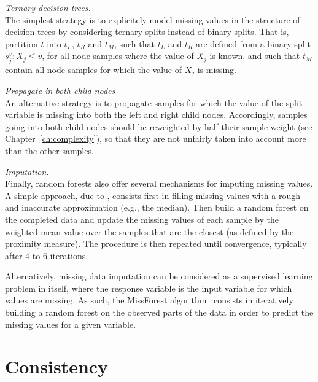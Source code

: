 \begin{description}

\item \textit{Ternary decision trees.}\hfill\\
    The simplest strategy is to explicitely model missing values in the
    structure of decision trees by considering ternary splits instead of binary
    splits. That is, partition $t$ into $t_L$, $t_R$ and $t_M$, such that $t_L$
    and $t_R$ are defined from a binary split $s_j^v : X_j \leq v$, for all node
    samples where the value of $X_j$ is known, and such that $t_M$ contain all node
    samples for which the value of $X_j$ is missing.

\item \textit{Propagate in both child nodes}\hfill\\
    An alternative strategy is to  propagate samples
    for which the value of the split variable is missing into both the left and
    right child nodes. Accordingly, samples going into both child nodes should be
    reweighted by half their sample weight (see Chapter~\ref{ch:complexity}), so
    that they are not unfairly taken into account more than the other samples.

\item \textit{Imputation.}\hfill\\
    Finally, random forests also offer several mechanisms for imputing missing
    values. A simple approach, due to \citep{breiman:2002}, consists first in
    filling missing values with a rough and inaccurate approximation (e.g., the
    median). Then build a random forest on the completed data and update the
    missing values of each sample by the weighted mean value over the samples
    that are the closest (as defined by the proximity measure). The procedure
    is then repeated  until convergence, typically after $4$ to $6$ iterations.

    Alternatively, missing data imputation can be considered as a supervised
    learning problem in itself, where the response variable is the input
    variable for which values are missing. As such, the MissForest
    algorithm~\citep{stekhoven:2012} consists in iteratively building a random
    forest on the observed parts of the data in order to predict the missing
    values for a given variable.

\end{description}


\section{Consistency}
\label{sec:4:consistency}

\todo{}



